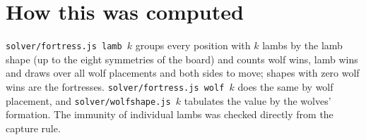 \documentclass[11pt,a4paper]{article}
\begin{document}
\section*{How this was computed}

\texttt{solver/fortress.js lamb $k$} groups every position with $k$ lambs by the
lamb shape (up to the eight symmetries of the board) and counts wolf wins, lamb
wins and draws over all wolf placements and both sides to move; shapes with zero
wolf wins are the fortresses. \texttt{solver/fortress.js wolf $k$} does the same
by wolf placement, and \texttt{solver/wolfshape.js $k$} tabulates the value by
the wolves' formation. The immunity of individual lambs was checked directly
from the capture rule.
\end{document}
